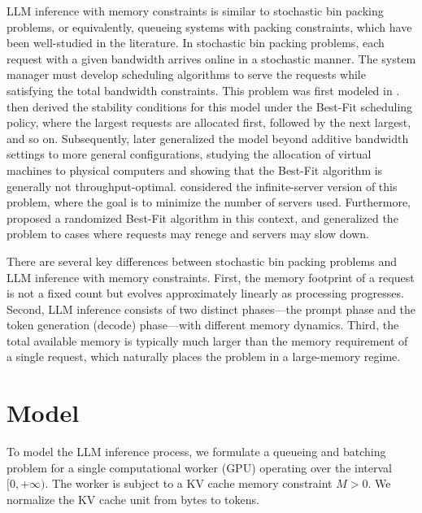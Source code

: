\documentclass{article}
\newcommand{\xhdr}[1]{\vspace{1mm} \noindent{\bf #1}}
\theoremstyle{plain}
\theoremstyle{definition}
\theoremstyle{remark}
\begin{document}
\xhdr{Stochastic Bin Packing Problems.} LLM inference with memory constraints is similar to stochastic bin packing problems, or equivalently, queueing systems with packing constraints, which have been well-studied in the literature. In stochastic bin packing problems, each request with a given bandwidth arrives online in a stochastic manner. The system manager must develop scheduling algorithms to serve the requests while satisfying the total bandwidth constraints. This problem was first modeled in \citet{coffman2001bandwidth}. \citet{gamarnik2004stochastic} then derived the stability conditions for this model under the Best-Fit scheduling policy, where the largest requests are allocated first, followed by the next largest, and so on. Subsequently,  \citet{maguluri2012stochastic} later generalized the model beyond additive bandwidth settings to more general configurations, studying the allocation of virtual machines to physical computers and showing that the Best-Fit algorithm is generally not throughput-optimal. \citet{stolyar2013infinite, stolyar2013large, stolyar2015asymptotic} considered the infinite-server version of this problem, where the goal is to minimize the number of servers used. Furthermore, \citet{ghaderi2014asymptotic} proposed a randomized Best-Fit algorithm in this context, and \citet{gupta2015lagrangian} generalized the problem to cases where requests may renege and servers may slow down.



There are several key differences between stochastic bin packing problems and LLM 
inference with memory constraints. First, the memory footprint of a request 
is not a fixed count but evolves approximately linearly as processing 
progresses. Second, LLM inference consists of two distinct phases---the 
prompt phase and the token generation (decode) phase---with different memory 
dynamics. Third, the total available memory is typically much larger than 
the memory requirement of a single request, which naturally places the 
problem in a large-memory regime.
\section{Model} \label{sec:model}

To model the LLM inference process, we formulate a queueing and batching problem for a single computational worker (GPU) operating over the interval \([0, +\infty) \). The worker is subject to a KV cache memory constraint \( M > 0 \). We normalize the KV cache unit from bytes to tokens.
\end{document}
